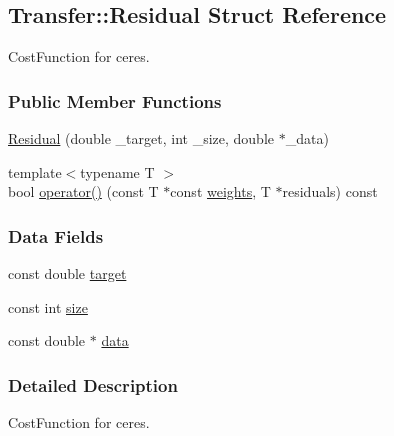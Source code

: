 \hypertarget{structTransfer_1_1Residual}{\subsection{\-Transfer\-:\-:\-Residual \-Struct \-Reference}
\label{structTransfer_1_1Residual}
}


\-Cost\-Function for ceres.  


\subsubsection*{\-Public \-Member \-Functions}
\begin{DoxyCompactItemize}
\item 
\hyperlink{structTransfer_1_1Residual_a4123741efe42de8c6ce5bca269d00408}{\-Residual} (double \-\_\-target, int \-\_\-size, double $\ast$\-\_\-data)
\item 
{\footnotesize template$<$typename T $>$ }\\bool \hyperlink{structTransfer_1_1Residual_a3a448fa481b96877dbf558d737490991}{operator()} (const \-T $\ast$const \hyperlink{classTransfer_a6dde3d7a1918d18582bfd4e803187926}{weights}, \-T $\ast$residuals) const 
\end{DoxyCompactItemize}
\subsubsection*{\-Data \-Fields}
\begin{DoxyCompactItemize}
\item 
const double \hyperlink{structTransfer_1_1Residual_a8e3dd4e4c95eac5b152618360bab2a15}{target}
\item 
const int \hyperlink{structTransfer_1_1Residual_a146501e7157821b956151e8aad19eceb}{size}
\item 
const double $\ast$ \hyperlink{structTransfer_1_1Residual_a1bd9651af31350c6086ac3d20f694a73}{data}
\end{DoxyCompactItemize}


\subsubsection{\-Detailed \-Description}
\-Cost\-Function for ceres. 

